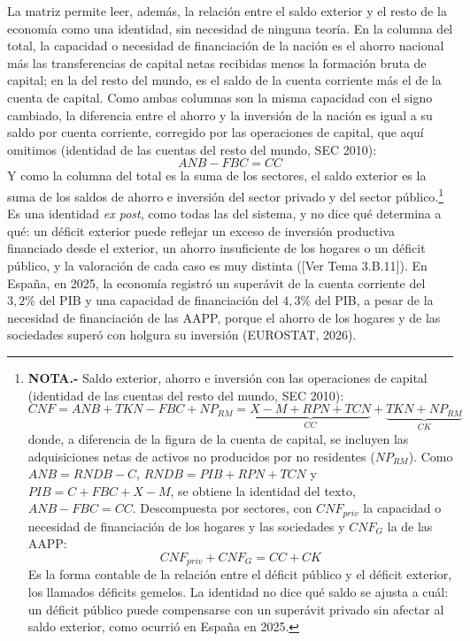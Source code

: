 \documentclass[10pt,a4paper]{article}
\newcommand{\authorfont}[1]{{\fontfamily{EBGaramond-TLF}\selectfont #1}}
\begin{document}
La matriz permite leer, además, la relación entre el saldo exterior y el resto de la economía como una identidad, sin necesidad de ninguna teoría. En la columna del total, la capacidad o necesidad de financiación de la nación es el ahorro nacional más las transferencias de capital netas recibidas menos la formación bruta de capital; en la del resto del mundo, es el saldo de la cuenta corriente más el de la cuenta de capital. Como ambas columnas son la misma capacidad con el signo cambiado, la diferencia entre el ahorro y la inversión de la nación es igual a su saldo por cuenta corriente, corregido por las operaciones de capital, que aquí omitimos (identidad de las cuentas del resto del mundo, SEC 2010):
$$ANB-FBC=CC$$
Y como la columna del total es la suma de los sectores, el saldo exterior es la suma de los saldos de ahorro e inversión del sector privado y del sector público.\footnote{%
    \textbf{NOTA.-} Saldo exterior, ahorro e inversión con las operaciones de capital (identidad de las cuentas del resto del mundo, SEC 2010):
    $$CNF=ANB+TKN-FBC+NP_{RM}=\underbrace{X-M+RPN+TCN}_{CC}+\underbrace{TKN+NP_{RM}}_{CK}$$
    donde, a diferencia de la figura de la cuenta de capital, se incluyen las adquisiciones netas de activos no producidos por no residentes ($NP_{RM}$). Como $ANB=RNDB-C$, $RNDB=PIB+RPN+TCN$ y $PIB=C+FBC+X-M$, se obtiene la identidad del texto, $ANB-FBC=CC$.
    Descompuesta por sectores, con $CNF_{priv}$ la capacidad o necesidad de financiación de los hogares y las sociedades y $CNF_G$ la de las AAPP:
    $$CNF_{priv}+CNF_G=CC+CK$$
    Es la forma contable de la relación entre el déficit público y el déficit exterior, los llamados déficits gemelos. La identidad no dice qué saldo se ajusta a cuál: un déficit público puede compensarse con un superávit privado sin afectar al saldo exterior, como ocurrió en España en 2025.
} Es una identidad \textit{ex post}, como todas las del sistema, y no dice qué determina a qué: un déficit exterior puede reflejar un exceso de inversión productiva financiado desde el exterior, un ahorro insuficiente de los hogares o un déficit público, y la valoración de cada caso es muy distinta ([\authorfont{Ver Tema 3.B.11}]). En España, en 2025, la economía registró un superávit de la cuenta corriente del $3{,}2\%$ del PIB y una capacidad de financiación del $4{,}3\%$ del PIB, a pesar de la necesidad de financiación de las AAPP, porque el ahorro de los hogares y de las sociedades superó con holgura su inversión (EUROSTAT, 2026).
\end{document}
